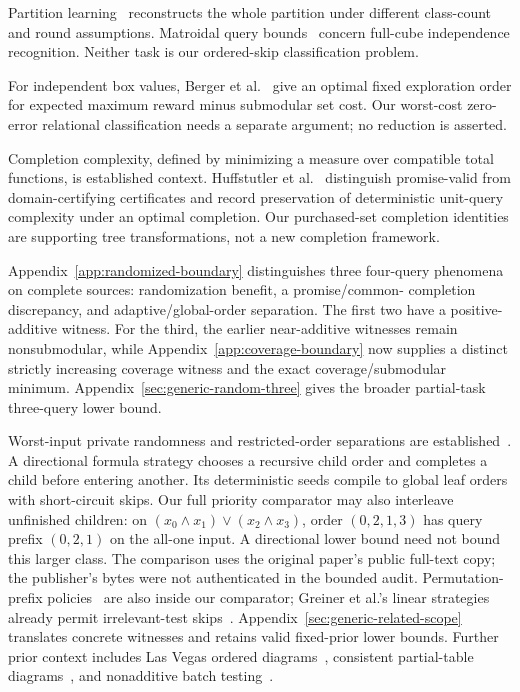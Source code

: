 \documentclass[pdflatex,sn-mathphys-num]{sn-jnl}
\theoremstyle{thmstyleone}
\theoremstyle{thmstylethree}
\theoremstyle{thmstyletwo}
\begin{document}
Partition learning~\cite{liu,black} reconstructs the whole partition under different class-count and round assumptions. Matroidal query bounds~\cite{kulkarni} concern full-cube independence recognition. Neither task is our ordered-skip classification problem.

For independent box values, Berger et al.~\cite{pandora} give an optimal fixed exploration order for expected maximum reward minus submodular set cost. Our worst-cost zero-error relational classification needs a separate argument; no reduction is asserted.

Completion complexity, defined by minimizing a measure over compatible total functions, is established context. Huffstutler et al.~\cite{huffstutler2026completion} distinguish promise-valid from domain-certifying certificates and record preservation of deterministic unit-query complexity under an optimal completion. Our purchased-set completion identities are supporting tree transformations, not a new completion framework.

Appendix~\ref{app:randomized-boundary} distinguishes three four-query
phenomena on complete sources: randomization benefit, a promise/common-
completion discrepancy, and adaptive/global-order separation. The first
two have a positive-additive witness. For the third, the earlier
near-additive witnesses remain nonsubmodular, while
Appendix~\ref{app:coverage-boundary} now supplies a distinct strictly
increasing coverage witness and the exact coverage/submodular minimum.
Appendix~\ref{sec:generic-random-three} gives the broader partial-task
three-query lower bound.

Worst-input private randomness and restricted-order separations are established~\cite{amano2011directional}. A directional formula strategy chooses a recursive child order and completes a child before entering another. Its deterministic seeds compile to global leaf orders with short-circuit skips. Our full priority comparator may also interleave unfinished children: on $(x_0\wedge x_1)\vee(x_2\wedge x_3)$, order $(0,2,1,3)$ has query prefix $(0,2,1)$ on the all-one input. A directional lower bound need not bound this larger class. The comparison uses the original paper's public full-text copy; the publisher's bytes were not authenticated in the bounded audit. Permutation-prefix policies~\cite{hellerstein2022adaptivity} are also inside our comparator; Greiner et al.'s linear strategies already permit irrelevant-test skips~\cite{greiner}. Appendix~\ref{sec:generic-related-scope} translates concrete witnesses and retains valid fixed-prior lower bounds. Further prior context includes Las Vegas ordered diagrams~\cite{karpinski1999}, consistent partial-table diagrams~\cite{kristensen2006}, and nonadditive batch testing~\cite{harris2025}.
\end{document}
